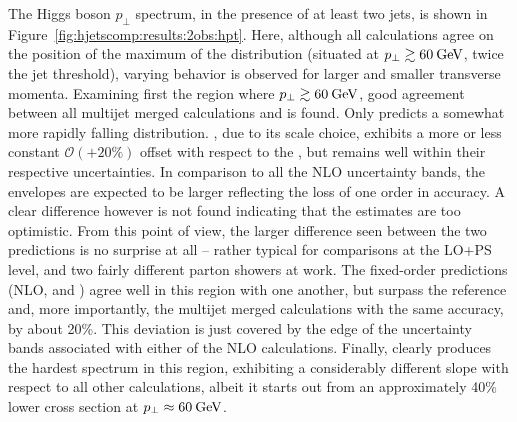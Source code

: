 The Higgs boson $p_\perp$ spectrum, in the presence of at least two
jets, is shown in Figure~\ref{fig:hjetscomp:results:2obs:hpt}.
Here, although all calculations agree on the position of the maximum 
of the distribution (situated at $p_\perp\gtrsim 60\text{\:GeV}$, twice the 
jet threshold), varying behavior is observed for larger and smaller 
transverse momenta. Examining first the region where $p_\perp\gtrsim 
60\text{\:GeV}$, good agreement between all multijet merged calculations and 
\Powheg is found. Only \Herwig predicts a somewhat more rapidly falling 
distribution. \Sherpa \NNLOPS, due to its scale choice, exhibits a 
more or less constant $\mathcal{O}(+20\%)$ offset with respect to the
\Powheg \NNLOPS, but remains well within their respective uncertainties.
In comparison to all the NLO uncertainty bands, the \NNLOPS envelopes
are expected to be larger reflecting the loss of one order in accuracy.
A clear difference however is not found indicating that the \NNLOPS
estimates are too optimistic. From this point of view, the larger
difference seen between the two \NNLOPS predictions is no surprise at
all -- rather typical for comparisons at the LO+PS level, and two
fairly different parton showers at work. The fixed-order
predictions (NLO, \Minlo and \Loopsim) agree well in this region with
one another, but surpass the \Powheg reference and, more importantly,
the multijet merged calculations with the same accuracy, by about 
20\%. This deviation is just covered by the edge of the uncertainty
bands associated with either of the NLO calculations. Finally, \Hej
clearly produces the hardest spectrum in this region, exhibiting a
considerably different slope with respect to all other calculations,
albeit it starts out from an approximately 40\% lower cross section at
$p_\perp\approx 60\text{\:GeV}$.

